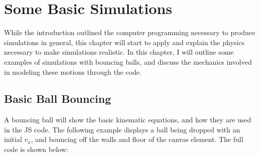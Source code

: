 
\chapter{Some Basic Simulations} %

\label{Chapter1} %




While the introduction outlined the computer programming necessary to produce simulations in general, this chapter will start to apply and explain the physics necessary to make simulations realistic.  In this chapter, I will outline some examples of simulations with bouncing balls, and discuss the mechanics involved in modeling these motions through the code.



\section{Basic Ball Bouncing}

A bouncing ball will show the basic kinematic equations, and how they are used in the JS code.  The following example displays a ball being dropped with an initial $v_x$, and bouncing off the walls and floor of the canvas element.  The full code is shown below:




